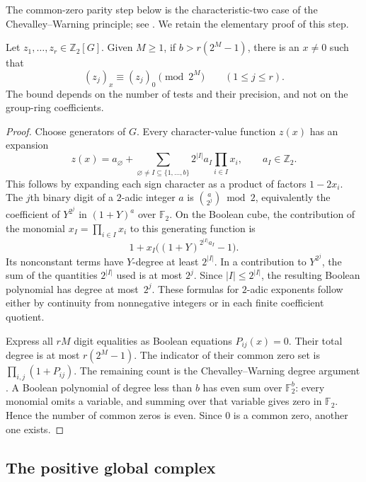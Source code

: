 The common-zero parity step below is the characteristic-two case of the
Chevalley--Warning principle; see
\cite[Section~1, equation~(1)]{HeathBrownChevalleyWarning}.
We retain the elementary proof of this step.

\begin{lemma}\label{cy:binary}
Let $z_1,\ldots,z_r\in\mathbb Z _2[G]$.  Given $M\geq1$, if
$b>r(2^M-1)$, there is an $x\ne0$ such that
\[
 (z_j)_x\equiv(z_j)_0\pmod {2^M}\qquad(1\leq j\leq r).
\]
The bound depends on the number of tests and their precision, and not on
the group-ring coefficients.
\end{lemma}
\begin{proof}
Choose generators of $G$.  Every character-value function $z(x)$ has an
expansion
\[
 z(x)=a_\varnothing+
       \sum_{\varnothing\ne I\subseteq\{1,\ldots,b\}}
           2^{|I|}a_I\prod_{i\in I}x_i,
       \qquad a_I\in\mathbb Z _2.
\]
This follows by expanding each sign character as a product of factors
$1-2x_i$.  The $j$th binary digit of a $2$-adic integer $a$ is
$\binom a{2^j}\bmod2$, equivalently the coefficient of $Y^{2^j}$ in
$(1+Y)^a$ over $\mathbb F _2$.  On the Boolean cube, the contribution of
the monomial $x_I=\prod_{i\in I}x_i$ to this generating function is
\[
 1+x_I\bigl((1+Y)^{2^{|I|}a_I}-1\bigr).
\]
Its nonconstant terms have $Y$-degree at least $2^{|I|}$.  In a contribution
to $Y^{2^j}$, the sum of the quantities $2^{|I|}$ used is at most $2^j$.
Since $|I|\leq2^{|I|}$, the resulting Boolean polynomial has degree at
most~$2^j$.  These formulas for $2$-adic exponents follow either by
continuity from nonnegative integers or in each finite coefficient
quotient.

Express all $rM$ digit equalities as Boolean equations $P_{ij}(x)=0$.
Their total degree is at most $r(2^M-1)$.  The indicator of their common
zero set is $\prod_{i,j}(1+P_{ij})$.  The remaining count is the
Chevalley--Warning degree argument \cite{Chevalley1935,Warning1935}.
A Boolean polynomial of degree less than $b$ has even sum over
$\mathbb F _2^b$: every monomial omits a variable,
and summing over that variable gives zero in $\mathbb F _2$.  Hence the
number of common zeros is even.  Since $0$ is a common zero, another one
exists.
\end{proof}

\subsection{The positive global complex}

